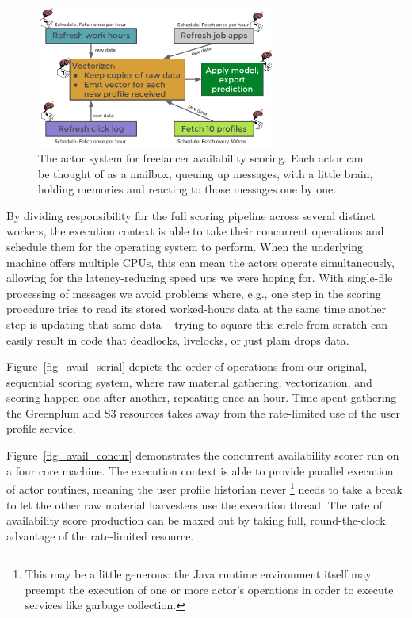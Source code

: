 \documentclass[tablecaption=bottom,wcp]{jmlr}
\begin{document}
\begin{figure}[h]
\includegraphics[width=0.7\textwidth]{fig/tex/availability_system.png}
\centering
\caption{The actor system for freelancer availability scoring. Each actor can be thought of
as a mailbox, queuing up messages, with a little brain, holding memories and reacting to 
those messages one by one.}
\label{fig_av_system}
\end{figure}

By dividing responsibility for the full scoring pipeline across several distinct workers,
the execution context is able to take their concurrent operations and schedule them
for the operating system to perform. When the underlying machine offers multiple
CPUs, this can mean the actors operate simultaneously, allowing for the 
latency-reducing speed ups we were hoping for. With single-file
processing of messages we avoid problems where, e.g., one step in the scoring 
procedure tries to read its stored worked-hours data at the same time another
step is updating that same data -- trying to square this circle from scratch
can easily result in code that deadlocks, livelocks, or just plain drops data.

Figure~\ref{fig_avail_serial} depicts the order of operations from our original,
sequential scoring system, where raw material gathering, vectorization, and
scoring happen one after another, repeating once an hour. Time spent gathering
the Greenplum and S3 resources takes away from the rate-limited use of
the user profile service.

Figure~\ref{fig_avail_concur} demonstrates the concurrent availability scorer
run on a four core machine. The execution context is able to provide parallel
execution of actor routines, meaning the user profile historian never \footnote{
This may be a little generous: the Java runtime environment itself may preempt
the execution of one or more actor's operations in order to execute services like
garbage collection.} needs to take a break to let the other raw material harvesters 
use the execution thread. The rate of availability score production can be maxed out 
by taking full, round-the-clock advantage of the rate-limited resource.
\end{document}
